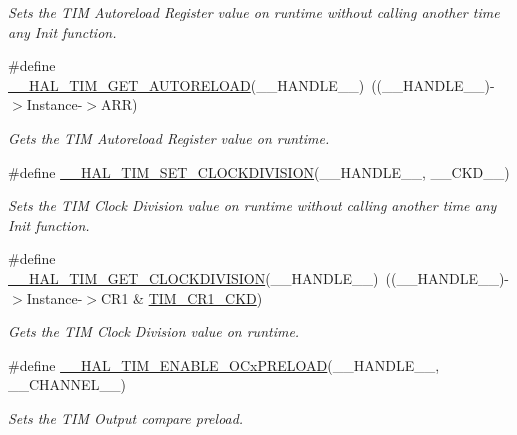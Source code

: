 \begin{DoxyCompactItemize}
\begin{DoxyCompactList}\small\item\em Sets the T\+IM Autoreload Register value on runtime without calling another time any Init function. \end{DoxyCompactList}\item 
\#define \hyperlink{group___t_i_m___exported___macros_gaa7a5c7645695bad15bacd402513a028a}{\+\_\+\+\_\+\+H\+A\+L\+\_\+\+T\+I\+M\+\_\+\+G\+E\+T\+\_\+\+A\+U\+T\+O\+R\+E\+L\+O\+AD}(\+\_\+\+\_\+\+H\+A\+N\+D\+L\+E\+\_\+\+\_\+)~((\+\_\+\+\_\+\+H\+A\+N\+D\+L\+E\+\_\+\+\_\+)-\/$>$Instance-\/$>$A\+RR)
\begin{DoxyCompactList}\small\item\em Gets the T\+IM Autoreload Register value on runtime. \end{DoxyCompactList}\item 
\#define \hyperlink{group___t_i_m___exported___macros_ga8aa84d77c670890408092630f9b2bdc4}{\+\_\+\+\_\+\+H\+A\+L\+\_\+\+T\+I\+M\+\_\+\+S\+E\+T\+\_\+\+C\+L\+O\+C\+K\+D\+I\+V\+I\+S\+I\+ON}(\+\_\+\+\_\+\+H\+A\+N\+D\+L\+E\+\_\+\+\_\+,  \+\_\+\+\_\+\+C\+K\+D\+\_\+\+\_\+)
\begin{DoxyCompactList}\small\item\em Sets the T\+IM Clock Division value on runtime without calling another time any Init function. \end{DoxyCompactList}\item 
\#define \hyperlink{group___t_i_m___exported___macros_gae6bc91bb5940bce52828c690f24001b8}{\+\_\+\+\_\+\+H\+A\+L\+\_\+\+T\+I\+M\+\_\+\+G\+E\+T\+\_\+\+C\+L\+O\+C\+K\+D\+I\+V\+I\+S\+I\+ON}(\+\_\+\+\_\+\+H\+A\+N\+D\+L\+E\+\_\+\+\_\+)~((\+\_\+\+\_\+\+H\+A\+N\+D\+L\+E\+\_\+\+\_\+)-\/$>$Instance-\/$>$C\+R1 \& \hyperlink{group___peripheral___registers___bits___definition_gacacc4ff7e5b75fd2e4e6b672ccd33a72}{T\+I\+M\+\_\+\+C\+R1\+\_\+\+C\+KD})
\begin{DoxyCompactList}\small\item\em Gets the T\+IM Clock Division value on runtime. \end{DoxyCompactList}\item 
\#define \hyperlink{group___t_i_m___exported___macros_ga199e848f0a301987a500faea0db2dd70}{\+\_\+\+\_\+\+H\+A\+L\+\_\+\+T\+I\+M\+\_\+\+E\+N\+A\+B\+L\+E\+\_\+\+O\+Cx\+P\+R\+E\+L\+O\+AD}(\+\_\+\+\_\+\+H\+A\+N\+D\+L\+E\+\_\+\+\_\+,  \+\_\+\+\_\+\+C\+H\+A\+N\+N\+E\+L\+\_\+\+\_\+)
\begin{DoxyCompactList}\small\item\em Sets the T\+IM Output compare preload. \end{DoxyCompactList}\item 

\end{DoxyCompactItemize}
